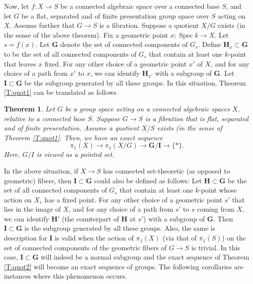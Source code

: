 \documentclass{amsart}
\newtheorem{thm}{Theorem}[section]
\theoremstyle{definition}
\theoremstyle{remark}
\theoremstyle{remark}
\let\:=\colon
\newcommand{\Spec}{\operatorname{Spec}}
\begin{document}
Now, let $f \: X \to S$ be a connected algebraic space over a
connected base $S$, and let $G$ be a flat, separated and of finite
presentation group space over $S$ acting on $X$. Assume further
that $G \to S$ is a fibration. Suppose a quotient $X/G$ exists (in
the sense of the above theorem). Fix a geometric point $x \: \Spec
k \to X$. Let $s=f(x)$. Let $\mathbf{G}$ denote the set of
connected components of $G_s$. Define $\mathbf{H}_x \subset
\mathbf{G}$ to be the set of all connected components of $G_s$
that contain at least one $k$-point that leaves $x$ fixed. For any
other choice of a geometric point $x'$
 of $X$, and for any choice of a path from $x'$ to $x$, we can
 identify $\mathbf{H}_{x'}$ with a subgroup of
$\mathbf{G}$. Let $\mathbf{I} \subset \mathbf{G}$ be the subgroup
generated by all these groups. In this situation, Theorem
\ref{T:quot1} can be translated as follows

\begin{thm}{\label{T:quot2}}
Let $G$ be a group space acting on a connected algebraic spaces
$X$, relative to a connected base $S$. Suppose $G \to S$ is a
fibration that is flat, separated and of finite presentation.
Assume a quotient $X/S$ exists (in the sense of Theorem
\ref{T:quot1}. Then, we have an exact sequence $$\pi_1(X) \to
\pi_1(X/G) \to \mathbf{G/I} \to \{*\}.$$ Here, $G/I$ is viewed as
a pointed set.
\end{thm}

In the above situation,  if $X \to S$ has connected set-theoretic
(as opposed to geometric) fibers, then $\mathbf{I} \subset
\mathbf{G}$ could also be defined as follows: Let $\mathbf{H}
\subset \mathbf{G}$ be the set of all connected components of
$G_s$ that contain at least one $k$-point whose action on $X_s$
has a fixed point. For any other choice of a geometric point $s'$
that lies in the image of $X$, and for any choice of a path from
$s'$ to $s$ coming from $X$, we can identify $\mathbf{H'}$ (the
counterpart of $\mathbf{H}$ at $s'$) with a subgroup of
$\mathbf{G}$. Then $\mathbf{I} \subset \mathbf{G}$ is the subgroup
generated by all these groups. Also, the same is description for
$\mathbf{I}$ is valid when the action of $\pi_1(X)$ (via that of
$\pi_1(S)$) on the set of connected components of the geometric
fibers of $G \to S$ is trivial. In this case, $\mathbf{I} \subset
\mathbf{G}$   will indeed be a normal subgroup and the exact
sequence of Theorem \ref{T:quot2} will become an exact sequence of
groups.  The following corollaries are instances where this
phenomenon occurs.
\end{document}
